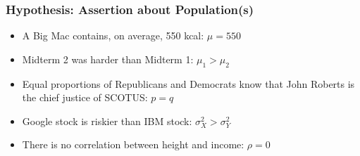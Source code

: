 \documentclass[handout]{beamer}
\begin{document}
\begin{frame}
\frametitle{Hypothesis: Assertion about Population(s)}
	\begin{itemize}
	\item A Big Mac contains, on average, 550 kcal: \alert{$\mu = 550$}
	\item Midterm 2 was harder than Midterm 1: \alert{$\mu_{1} >\mu_2$}
	\item Equal proportions of Republicans and Democrats know that John Roberts is the chief justice of SCOTUS: \alert{$p = q$}
	\item Google stock is riskier than IBM stock: \alert{$\sigma^2_{X} > \sigma^2_{Y}$}
	\item There is no correlation between height and income: \alert{$\rho = 0$} 
	\end{itemize}
\end{frame}
\end{document}
